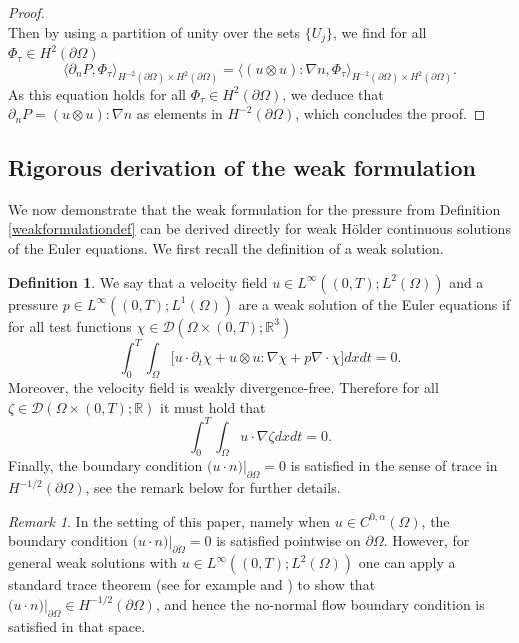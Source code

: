 \documentclass[12pt,a4paper]{article}
\theoremstyle{definition}
\newtheorem{definition}[theorem]{Definition}
\theoremstyle{remark}
\newtheorem{remark}[theorem]{Remark}
\numberwithin{equation}{section}
\begin{document}
\begin{proof}
\begin{equation}
\end{equation}
Then by using a partition of unity over the sets $\{ U_j \}$, we find for all $\Phi_\tau \in H^2 (\partial \Omega)$
\begin{equation}
\langle \partial_n P , \Phi_\tau \rangle_{H^{-2} (\partial \Omega) \times H^2 (\partial \Omega)} = \langle (u \otimes u) : \nabla n , \Phi_\tau \rangle_{H^{-2} (\partial \Omega) \times H^2 (\partial \Omega)}.
\end{equation}
As this equation holds for all $\Phi_\tau \in H^2 (\partial \Omega)$, we deduce that $\partial_n P = (u \otimes u) : \nabla n$ as elements in $H^{-2} (\partial \Omega)$, which concludes the proof.
\end{proof}
\subsection{Rigorous derivation of the weak formulation}
We now demonstrate that the weak formulation for the pressure from Definition \ref{weakformulationdef} can be derived directly for weak Hölder continuous solutions of the Euler equations. We first recall the definition of a weak solution.
\begin{definition} \label{weaksoleuler}
We say that a velocity field $u \in L^\infty ((0,T); L^2 (\Omega))$ and a pressure $p \in L^\infty ((0,T); L^1 (\Omega))$ are a weak solution of the Euler equations if for all test functions $\chi \in \mathcal{D} (\Omega \times (0,T); \mathbb{R}^3)$
\begin{equation}
\int_0^T \int_\Omega \bigg[ u \cdot \partial_t \chi + u \otimes u : \nabla \chi + p \nabla \cdot \chi \bigg] dx dt = 0.
\end{equation}
Moreover, the velocity field is weakly divergence-free. Therefore for all $\zeta \in \mathcal{D} (\Omega \times (0,T); \mathbb{R})$ it must hold that
\begin{equation}
\int_0^T \int_\Omega u \cdot \nabla \zeta dx dt = 0.
\end{equation}
Finally, the boundary condition $\big( u \cdot n \big) \lvert_{\partial \Omega} = 0$ is satisfied in the sense of trace in $H^{-1/2} (\partial \Omega)$, see the remark below for further details.
\end{definition}
\begin{remark}
In the setting of this paper, namely when $u \in C^{0,\alpha} (\Omega)$, the boundary condition $\big( u \cdot n \big) \lvert_{\partial \Omega} = 0$ is satisfied pointwise on $\partial \Omega$. However, for general weak solutions with $u \in L^\infty ((0,T); L^2 (\Omega))$ one can apply a standard trace theorem (see for example \cite[~Lemma 20.2]{tartar} and \cite[~Proposition 1.4]{constantinbook}) to show that $\big( u \cdot n \big) \lvert_{\partial \Omega} \in H^{-1/2} (\partial \Omega)$, and hence the no-normal flow boundary condition is satisfied in that space.
\end{remark}
\end{document}
